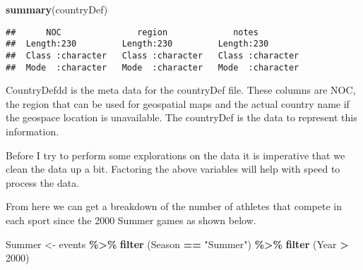 \documentclass[
]{article}
\newenvironment{Shaded}{\begin{snugshade}}{\end{snugshade}}
\newcommand{\AttributeTok}[1]{\textcolor[rgb]{0.13,0.29,0.53}{#1}}
\newcommand{\CommentTok}[1]{\textcolor[rgb]{0.56,0.35,0.01}{\textit{#1}}}
\newcommand{\DecValTok}[1]{\textcolor[rgb]{0.00,0.00,0.81}{#1}}
\newcommand{\FunctionTok}[1]{\textcolor[rgb]{0.13,0.29,0.53}{\textbf{#1}}}
\newcommand{\NormalTok}[1]{#1}
\newcommand{\OtherTok}[1]{\textcolor[rgb]{0.56,0.35,0.01}{#1}}
\newcommand{\SpecialCharTok}[1]{\textcolor[rgb]{0.81,0.36,0.00}{\textbf{#1}}}
\newcommand{\StringTok}[1]{\textcolor[rgb]{0.31,0.60,0.02}{#1}}
\begin{document}
\begin{Shaded}
\begin{Highlighting}[]
\FunctionTok{summary}\NormalTok{(countryDef)}
\end{Highlighting}
\end{Shaded}

\begin{verbatim}
##      NOC               region             notes          
##  Length:230         Length:230         Length:230        
##  Class :character   Class :character   Class :character  
##  Mode  :character   Mode  :character   Mode  :character
\end{verbatim}

CountryDefdd is the meta data for the countryDef file. These columns are NOC, the region that can be used for geospatial maps and the actual country name if the geospace location is unavailable. The countryDef is the data to represent this information.

Before I try to perform some explorations on the data it is imperative that we clean the data up a bit. Factoring the above variables will help with speed to process the data.

\begin{Shaded}
\end{Shaded}

From here we can get a breakdown of the number of athletes that compete in each sport since the 2000 Summer games as shown below.

\begin{Shaded}
\begin{Highlighting}[]
\NormalTok{Summer }\OtherTok{\textless{}{-}}\NormalTok{ events }\SpecialCharTok{\%\textgreater{}\%} \FunctionTok{filter}\NormalTok{ (Season }\SpecialCharTok{==} \StringTok{"Summer"}\NormalTok{) }\SpecialCharTok{\%\textgreater{}\%} \FunctionTok{filter}\NormalTok{ (Year }\SpecialCharTok{\textgreater{}} \DecValTok{2000}\NormalTok{)}
\end{Highlighting}
\end{Shaded}
\end{document}
